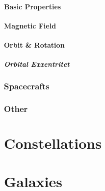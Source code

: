 \paragraph{Basic Properties}
\paragraph{Magnetic Field}
\paragraph{Orbit \& Rotation}
\subparagraph{Orbital Exxentritet}
\subsubsection{Spacecrafts}
\subsubsection{Other}
\section{Constellations}
\section{Galaxies}

